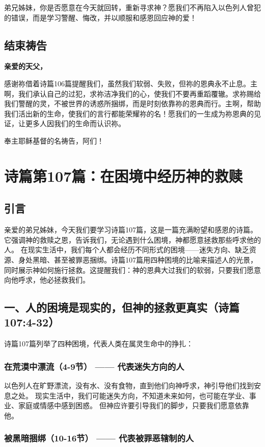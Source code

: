 \documentclass[a4paper, 12pt]{article}
\begin{document}
弟兄姊妹，你是否愿意在今天就回转，重新寻求神？愿我们不再陷入以色列人曾犯的错误，而是学习警醒、悔改，并以顺服和感恩回应神的爱！

\subsection*{结束祷告}
\textbf{亲爱的天父，}

感谢祢借着诗篇106篇提醒我们，虽然我们软弱、失败，但祢的恩典永不止息。主啊，我们承认自己的过犯，求祢洁净我们的心，使我们不要再重蹈覆辙。求祢赐给我们警醒的灵，不被世界的诱惑所捆绑，而是时刻依靠祢的恩典而行。主啊，帮助我们活出新的生命，使我们的言行都能荣耀祢的名！愿我们的一生成为祢恩典的见证，让更多人因我们的生命而认识祢。

奉主耶稣基督的名祷告，阿们！
\newpage
\section{诗篇第107篇：在困境中经历神的救赎}
\subsection*{引言}
亲爱的弟兄姊妹，今天我们要学习诗篇107篇，这是一篇充满盼望和感恩的诗篇。它强调神的救赎之恩，告诉我们，无论遇到什么困境，神都愿意拯救那些呼求他的人。
在现实生活中，我们每个人都会经历不同形式的困境——迷失方向、缺乏资源、身处黑暗、甚至被罪恶捆绑。诗篇107篇用四种困境的比喻来描述人的光景，同时展示神如何施行拯救。这提醒我们：神的恩典大过我们的软弱，只要我们愿意向他呼求，他必拯救我们。
\subsection*{一、人的困境是现实的，但神的拯救更真实（诗篇107:4-32）}
诗篇107篇列举了四种困境，代表人类在属灵生命中的挣扎：

\subsubsection*{在荒漠中漂流（4-9节） —— 代表迷失方向的人}

以色列人在旷野漂流，没有水、没有食物，直到他们向神呼求，神引导他们找到安息之处。
现实生活中，我们可能迷失方向，不知道未来如何，也可能在学业、事业、家庭或情感中感到困惑。
但神应许要引导我们的脚步，只要我们愿意依靠他。
\subsubsection*{被黑暗捆绑（10-16节） —— 代表被罪恶辖制的人}
\end{document}

